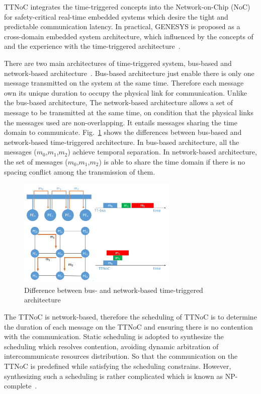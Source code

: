 \documentclass[journal]{IEEEtran}
\begin{document}
TTNoC integrates the time-triggered concepts into the Network-on-Chip (NoC) for safety-critical real-time embedded systems which desire the tight and predictable communication latency.
In practical, GENESYS is proposed as a cross-domain embedded system architecture, which influenced by the concepts of and the experience with the time-triggered architecture~\cite{DBLP:conf/ladc/Kopetz11}.

There are two main architectures of time-triggered system, bus-based and network-based architecture~\cite{DBLP:conf/date/HuangBRBK12}.
Bus-based architecture just enable there is only one message transmitted on the system at the same time. 
Therefore each message own its unique duration to occupy the physical link for communication.
Unlike the bus-based architecture, The network-based architecture allows a set of message to be transmitted at the same time, on condition that the physical links the messages used are non-overlapping.
It entails messages sharing the time domain to communicate. Fig.~\ref{f:diff} shows the differences between bus-based and network-based time-triggered architecture.
In bus-based architecture, all the messages ($m_0$,$m_1$,$m_2$) achieve temporal separation. 
In network-based architecture, the set of messages ($m_0$,$m_1$,$m_2$) is able to share the time domain if there is no spacing conflict among the transmission of them.
\begin{figure}[!t]
	\centering
	\includegraphics[width=3in]{picture/difference.pdf}
	\caption{Difference between bus- and network-based time-triggered architecture}
	\label{f:diff}
\end{figure}

The TTNoC is network-based, therefore the scheduling of TTNoC is to determine the duration of each message on the TTNoC and ensuring there is no contention with the communication. 
Static scheduling is adopted to synthesize the scheduling which resolves contention, avoiding dynamic arbitration of intercommunicate resources distribution. 
So that the communication on the TTNoC is predefined while satisfying the scheduling constrains.
However, synthesizing such a scheduling is rather complicated which is known as NP-complete~\cite{DBLP:conf/date/HuangBRBK12,DBLP:conf/rtss/Steiner10}.
\end{document}
